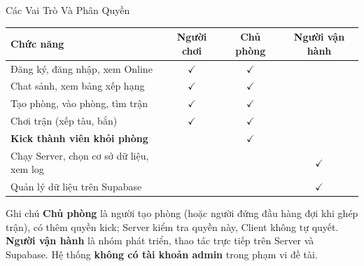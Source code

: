 \begin{frame}[label=vaitro]{Các Vai Trò Và Phân Quyền}
  \footnotesize
  \begin{tabularx}{\textwidth}{@{}Y c c c@{}}
    \toprule
    \textbf{Chức năng} & \textbf{Người chơi} & \textbf{Chủ phòng} & \textbf{Người vận hành} \\
    \midrule
    Đăng ký, đăng nhập, xem Online & $\checkmark$ & $\checkmark$ & \\
    Chat sảnh, xem bảng xếp hạng & $\checkmark$ & $\checkmark$ & \\
    Tạo phòng, vào phòng, tìm trận & $\checkmark$ & $\checkmark$ & \\
    Chơi trận (xếp tàu, bắn) & $\checkmark$ & $\checkmark$ & \\
    \textbf{Kick thành viên khỏi phòng} & & $\checkmark$ & \\
    Chạy Server, chọn cơ sở dữ liệu, xem log & & & $\checkmark$ \\
    Quản lý dữ liệu trên Supabase & & & $\checkmark$ \\
    \bottomrule
  \end{tabularx}
  \vspace{0.2cm}
  \begin{alertblock}{Ghi chú}
    \scriptsize \textbf{Chủ phòng} là người tạo phòng (hoặc người đứng đầu hàng đợi khi ghép trận), có thêm quyền kick; Server kiểm tra quyền này, Client không tự quyết. \textbf{Người vận hành} là nhóm phát triển, thao tác trực tiếp trên Server và Supabase. Hệ thống \textbf{không có tài khoản admin} trong phạm vi đề tài.
  \end{alertblock}
\end{frame}

